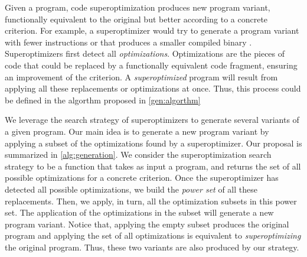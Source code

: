 Given a program, code superoptimization produces new program variant, functionally equivalent to the original but better according to a concrete criterion. For example, a superoptimizer would try to generate a program variant with fewer instructions or that produces a smaller compiled binary \cite{1987_Massalin_Sueroptimizer}. Superoptimizers first detect all \emph{optimizations}. Optimizations are the pieces of code that could be replaced by a functionally equivalent code fragment, ensuring an improvement of the criterion. A \emph{superoptimized} program will result from applying all these replacements or optimizations at once. Thus, this process could be defined in the algorthm proposed in \autoref{gen:algorthm}


We leverage the search strategy of superoptimizers to generate several variants of a given program. Our main idea is to generate a new program variant by applying a subset of the optimizations found by a superoptimizer. Our proposal is summarized in \autoref{alg:generation}. We consider the superoptimization search strategy to be a function that takes as input a program, and returns the set of all possible optimizations for a concrete criterion. Once the superoptimizer has detected all possible optimizations, we build the \emph{power set} of all these replacements. Then, we apply, in turn, all the optimization subsets in this power set. The application of the optimizations in the subset will generate a new program variant. Notice that, applying the empty subset produces the original program and applying the set of all optimizations is equivalent to \emph{superoptimizing} the original program. Thus, these two variants are also produced by our strategy.






